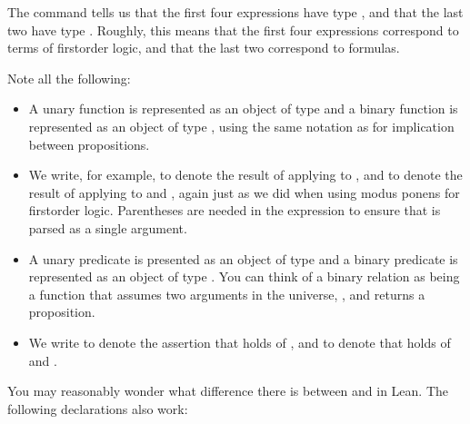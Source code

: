 \documentclass[letterpaper,10pt,english]{sphinxmanual}
\begin{document}
\sphinxAtStartPar
The  command tells us that the first four expressions have type , and that the last two have type . Roughly, this means that the first four expressions correspond to terms of first\sphinxhyphen{}order logic, and that the last two correspond to formulas.

\sphinxAtStartPar
Note all the following:
\begin{itemize}
\item {} 
\sphinxAtStartPar
A unary function is represented as an object of type  and a binary function is represented as an object of type , using the same notation as for implication between propositions.

\item {} 
\sphinxAtStartPar
We write, for example,  to denote the result of applying  to , and  to denote the result of applying  to  and , again just as we did when using modus ponens for first\sphinxhyphen{}order logic. Parentheses are needed in the expression  to ensure that  is parsed as a single argument.

\item {} 
\sphinxAtStartPar
A unary predicate is presented as an object of type  and a binary predicate is represented as an object of type . You can think of a binary relation  as being a function that assumes two arguments in the universe, , and returns a proposition.

\item {} 
\sphinxAtStartPar
We write  to denote the assertion that  holds of , and  to denote that  holds of  and .

\end{itemize}

\sphinxAtStartPar
You may reasonably wonder what difference there is between
 and  in Lean.
The following declarations also work:
\end{document}
